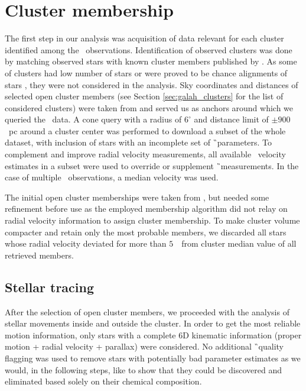 \section{Cluster membership}
\label{sec:membership_v2}
The first step in our analysis was acquisition of data relevant for each cluster identified among the \Gh\ observations. Identification of observed clusters was done by matching observed stars with known cluster members published by \citet{2018A&A...618A..93C}. As some of clusters had low number of stars or were proved to be chance alignments of stars \citep{2018MNRAS.480.5242K}, they were not considered in the analysis. Sky coordinates and distances of selected open cluster members (see Section \ref{sec:galah_clusters} for the list of considered clusters) were taken from \citet{2018A&A...618A..93C} and served us as anchors around which we queried the \Gs\ data. A cone query with a radius of $6^\circ$ and distance limit of $\pm900$~pc around a cluster center was performed to download a subset of the whole dataset, with inclusion of stars with an incomplete set of \G\ parameters. To complement and improve radial velocity measurements, all available \Gh\ velocity estimates in a subset were used to override or supplement \G\ measurements. In the case of multiple \Gh\ observations, a median velocity was used.

The initial open cluster memberships were taken from \citet{2018A&A...618A..93C}, but needed some refinement before use as the employed membership algorithm did not relay on radial velocity information to assign cluster membership. To make cluster volume compacter and retain only the most probable members, we discarded all stars whose radial velocity deviated for more than $5$~\kms\ from cluster median value of all retrieved members.

\subsection{Stellar tracing}
\label{sec:orbit_tracing}
After the selection of open cluster members, we proceeded with the analysis of stellar movements inside and outside the cluster. In order to get the most reliable motion information, only stars with a complete 6D kinematic information (proper motion + radial velocity + parallax) were considered. No additional \G\ quality flagging was used to remove stars with potentially bad parameter estimates as we would, in the following steps, like to show that they could be discovered and eliminated based solely on their chemical composition.

